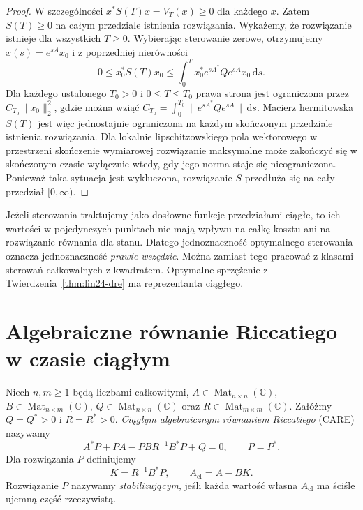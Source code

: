 \begin{proof}
W szczególności
\(x^*S(T)x=V_T(x)\ge0\)
dla każdego \(x\).
Zatem \(S(T)\ge0\)
na całym przedziale
istnienia rozwiązania.
Wykażemy, że rozwiązanie
istnieje dla wszystkich
\(T\ge0\).
Wybierając sterowanie zerowe,
otrzymujemy \(x(s)=e^{sA}x_0\)
i z poprzedniej nierówności
\[
 0\le x_0^*S(T)x_0
 \le\int_0^T
        x_0^*e^{sA^*}Qe^{sA}x_0
       \,\mathrm ds.
\]
Dla każdego ustalonego
\(T_0>0\) i \(0\le T\le T_0\)
prawa strona jest ograniczona
przez \(C_{T_0}\|x_0\|_2^2\),
gdzie można wziąć
\(C_{T_0}=\int_0^{T_0}
 \|e^{sA^*}Qe^{sA}\|\,\mathrm ds\).
Macierz hermitowska \(S(T)\)
jest więc jednostajnie
ograniczona na każdym
skończonym przedziale
istnienia rozwiązania.
Dla lokalnie lipschitzowskiego
pola wektorowego w przestrzeni
skończenie wymiarowej
rozwiązanie maksymalne
może zakończyć się w skończonym
czasie wyłącznie wtedy,
gdy jego norma staje się
nieograniczona.
Ponieważ taka sytuacja
jest wykluczona,
rozwiązanie \(S\)
przedłuża się na
cały przedział \([0,\infty)\).
\end{proof}

\begin{uwaga}
\label{rem:lin24-ae}
Jeżeli sterowania traktujemy
jako dosłowne funkcje
przedziałami ciągłe,
to ich wartości w pojedynczych
punktach nie mają wpływu
na całkę kosztu ani na
rozwiązanie równania dla stanu.
Dlatego jednoznaczność
optymalnego sterowania
oznacza jednoznaczność
\emph{prawie wszędzie}.
Można zamiast tego
pracować z klasami
sterowań całkowalnych
z kwadratem. Optymalne
sprzężenie z
Twierdzenia~\ref{thm:lin24-dre}
ma reprezentanta ciągłego.
\end{uwaga}

\section{Algebraiczne równanie Riccatiego w czasie ciągłym}
\label{sec:lin24-care}

\begin{definicja}
\label{def:lin24-care}
Niech \(n,m\ge1\) będą liczbami całkowitymi,
\(A\in\operatorname{Mat}_{n\times n}(\mathbb C)\),
\(B\in\operatorname{Mat}_{n\times m}(\mathbb C)\),
\(Q\in\operatorname{Mat}_{n\times n}(\mathbb C)\)
oraz \(R\in\operatorname{Mat}_{m\times m}(\mathbb C)\).
Załóżmy \(Q=Q^*>0\) i \(R=R^*>0\).
\emph{Ciągłym algebraicznym
równaniem Riccatiego} (CARE)
nazywamy
\[
 A^*P+PA-PBR^{-1}B^*P+Q=0,
 \qquad P=P^*.
\]
Dla rozwiązania \(P\)
definiujemy
\[
 K=R^{-1}B^*P,
 \qquad A_{\mathrm{cl}}=A-BK.
\]
Rozwiązanie \(P\)
nazywamy \emph{stabilizującym},
jeśli każda wartość własna
\(A_{\mathrm{cl}}\) ma
ściśle ujemną część rzeczywistą.
\end{definicja}

